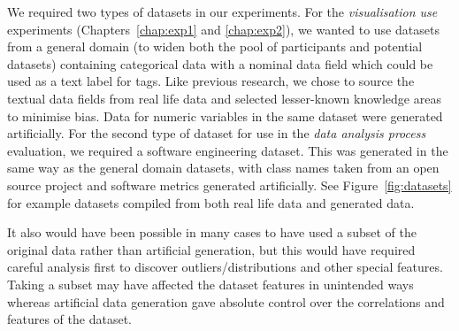 We required two types of datasets in our experiments. For the \emph{visualisation use} experiments (Chapters~\ref{chap:exp1} and \ref{chap:exp2}), we wanted to use datasets from a general domain (to widen both the pool of participants and potential datasets) containing categorical data with a nominal data field which could be used as a text label for tags. Like previous research, we chose to source the textual data fields from real life data and selected lesser-known knowledge areas to minimise bias. Data for numeric variables in the same dataset were generated artificially. For the second type of dataset for use in the \emph{data analysis process} evaluation, we required a software engineering dataset. This was generated in the same way as the general domain datasets, with class names taken from an open source project and software metrics generated artificially. See Figure~\vref{fig:datasets} for example datasets compiled from both real life data and generated data.

It also would have been possible in many cases to have used a subset of the original data rather than artificial generation, but this would have required careful analysis first to discover outliers/distributions and other special features. Taking a subset may have affected the dataset features in unintended ways whereas artificial data generation gave absolute control over the correlations and features of the dataset.


